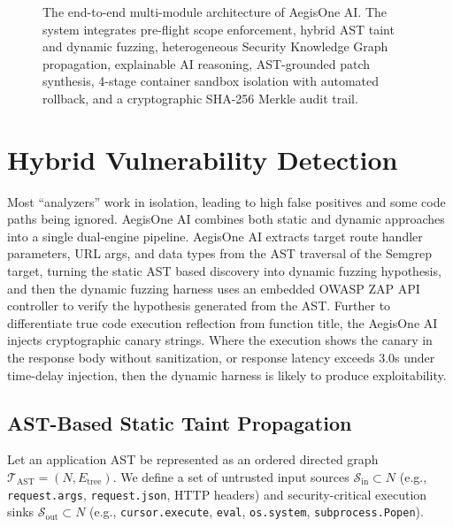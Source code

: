 \documentclass[journal,twoside]{IEEEtran}
\begin{document}
\begin{figure}[!t]
\caption{The end-to-end multi-module architecture of AegisOne AI. The system integrates pre-flight scope enforcement, hybrid AST taint and dynamic fuzzing, heterogeneous Security Knowledge Graph propagation, explainable AI reasoning, AST-grounded patch synthesis, 4-stage container sandbox isolation with automated rollback, and a cryptographic SHA-256 Merkle audit trail.}
\label{fig:architecture}
\end{figure}

\section{Hybrid Vulnerability Detection}
Most ``analyzers'' work in isolation, leading to high false positives and some code paths being ignored. AegisOne AI combines both static and dynamic approaches into a single dual-engine pipeline. AegisOne AI extracts target route handler parameters, URL args, and data types from the AST traversal of the Semgrep target, turning the static AST based discovery into dynamic fuzzing hypothesis, and then the dynamic fuzzing harness uses an embedded OWASP ZAP API controller to verify the hypothesis generated from the AST. Further to differentiate true code execution reflection from function title, the AegisOne AI injects cryptographic canary strings. Where the execution shows the canary in the response body without sanitization, or response latency exceeds 3.0s under time-delay injection, then the dynamic harness is likely to produce exploitability.

\subsection{AST-Based Static Taint Propagation}
Let an application AST be represented as an ordered directed graph $\mathcal{T}_{\text{AST}} = (N, E_{\text{tree}})$. We define a set of untrusted input sources $\mathcal{S}_{\text{in}} \subset N$ (e.g., \texttt{request.args}, \texttt{request.json}, HTTP headers) and security-critical execution sinks $\mathcal{S}_{\text{out}} \subset N$ (e.g., \texttt{cursor.execute}, \texttt{eval}, \texttt{os.system}, \texttt{subprocess.Popen}).
\end{document}
